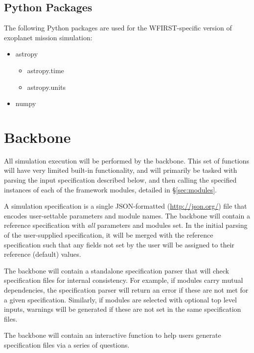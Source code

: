 \documentclass[]{asme2ej}
\begin{document}
\subsection{Python Packages}
The following Python packages are used for the WFIRST-specific version of exoplanet mission simulation:

\begin{itemize}
    \item astropy
        \begin{itemize}
            \item astropy.time
            \item astropy.units
        \end{itemize}
    \item numpy 
\end{itemize}


\section{Backbone}
All simulation execution will be performed by the backbone.  This set of functions will have very limited built-in functionality, and will primarily be tasked with parsing the input specification described below, and then calling the specified instances of each of the framework modules, detailed in \S\ref{sec:modules}.

A simulation specification is a single JSON-formatted (\url{http://json.org/}) file that encodes user-settable parameters and module names.  The backbone will contain a reference specification with \emph{all} parameters and modules set.  In the initial parsing of the user-supplied specification, it will be merged with the reference specification such that any fields not set by the user will be assigned to their reference (default) values. 

The backbone will contain a standalone specification parser that will check specification files for internal consistency.  For example, if modules carry mutual dependencies, the specification parser will return an error if these are not met for a given specification.  Similarly, if modules are selected with optional top level inputs, warnings will be generated if these are not set in the same specification files.

The backbone will contain an interactive function to help users generate specification files via a series of questions.
\end{document}
